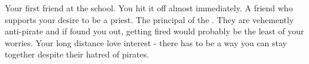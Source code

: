 \documentclass[char]{GL2020}
\begin{document}
\begin{contacts}
	\contact{\cEthics{}} Your first friend at the school. You hit it off almost immediately.
	\contact{\cBunker{}} A friend who supports your desire to be a priest.
	\contact{\cPrincipal{}} The principal of the \pSchool{}. They are vehemently anti-pirate and if \cPirate{\they} found you out, getting fired would probably be the least of your worries.
	\contact{\cPrince{}} Your long distance love interest - there has to be a way you can stay together despite their hatred of pirates.
\end{contacts}
\end{document}
